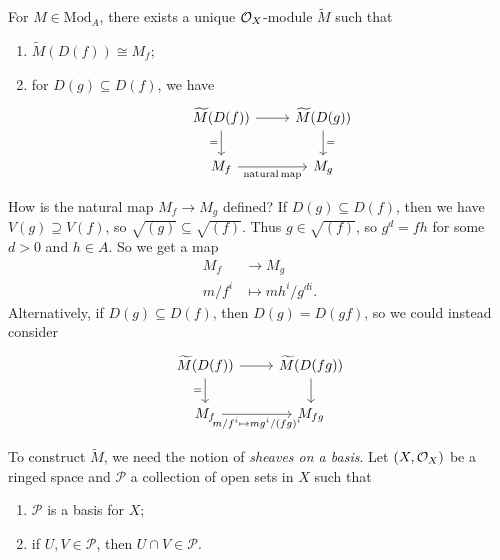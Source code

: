 \begin{theorem}\label{thm:unique-OX-module}
  For $M \in \mathrm{Mod}_A$,
  there exists a unique $\mathcal{O}_X$-module
  $\widetilde{M}$ such that
  \begin{enumerate}
    \item $\widetilde{M}(D(f)) \cong M_f$;
    \item for $D(g) \subseteq D(f)$,
      we have
      \[
        \begin{tikzcd}
          \widetilde{M}(D(f))
          \ar[r] \ar[d, "=", swap]
          & \widetilde{M}(D(g)) \ar[d, "="] \\
          M_f
          \ar[r, "\mathrm{natural\, map}", swap]
          & M_g
        \end{tikzcd}
      \]
  \end{enumerate}
\end{theorem}

\begin{remark}
  How is the natural map
  $M_f \to M_g$ defined? If
  $D(g) \subseteq D(f)$, then we have
  $V(g) \supseteq V(f)$, so
  $\sqrt{(g)} \subseteq \sqrt{(f)}$.
  Thus $g \in \sqrt{(f)}$, so
  $g^d = fh$ for some $d > 0$ and
  $h \in A$. So we get a map
  \begin{align*}
    M_f &\longrightarrow M_g \\
    m / f^i
    &\longmapsto 
    mh^i / g^{d i}.
  \end{align*}
  Alternatively, if $D(g) \subseteq D(f)$,
  then $D(g) = D(gf)$, so we could
  instead consider
  \[
    \begin{tikzcd}
      \widetilde{M}(D(f))
      \ar[r] \ar[d, "=",swap]
      & \widetilde{M}(D(fg)) \ar[d] \\
      M_f
      \ar[r, "m / f^i \mapsto m g^i / (fg)^i", swap]
      & M_{fg}
    \end{tikzcd}
  \]
\end{remark}

\begin{remark}
  To construct $\widetilde{M}$,
  we need the notion of
  \emph{sheaves on a basis}. Let
  $(X, \mathcal{O}_X)$ be a ringed space and
  $\mathcal{P}$ a collection of
  open sets in $X$ such that
  \begin{enumerate}
    \item $\mathcal{P}$ is a
      basis for $X$;
    \item  if $U, V \in \mathcal{P}$,
      then $U \cap V \in \mathcal{P}$.
  \end{enumerate}
\end{remark}

